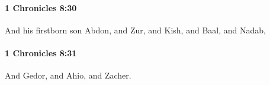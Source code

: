 		\paragraph{1 Chronicles 8:30} %
			\label{1CHRONICLES-8-30}

			And his firstborn son Abdon, and Zur, and Kish, and Baal, and Nadab,


		\paragraph{1 Chronicles 8:31} %
			\label{1CHRONICLES-8-31}

			And Gedor, and Ahio, and Zacher.



